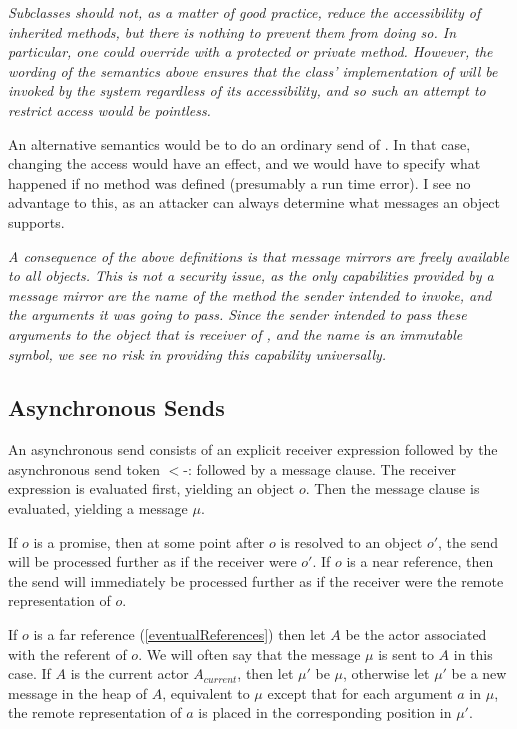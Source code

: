 \documentclass{article}
\begin{document}
{\it
Subclasses should not, as a matter of good practice, reduce the accessibility of inherited methods, but there is nothing to prevent them from doing so. In particular, one could override  with a protected or private method. However, the wording of the semantics above ensures that the class' implementation of    will be invoked by the system regardless of its accessibility, and so such an attempt to restrict access would be pointless.


An alternative semantics would be to do an ordinary send of  . In that case, changing the access would have an effect, and we would have to specify what happened if no
  method was defined (presumably a run time error). I see no advantage to
 this, as an attacker can always determine what messages an object supports.
}

{\it
A consequence of the above definitions is that message mirrors are freely available to all objects. This is not a security issue, as the only capabilities provided by a message mirror are the name of the method the sender intended to invoke, and the arguments it was going to pass. Since the sender intended to pass these arguments to the object that is receiver of , and the name is an immutable symbol, we see no risk in providing this capability universally.
}


\subsection{Asynchronous Sends}
\label{asynchronousSends}

An asynchronous send consists of an explicit receiver expression followed by the asynchronous send token $<$-: followed by a message clause. 
The receiver expression is evaluated first, yielding an object $o$. Then the message clause is evaluated, yielding a message $\mu$.

If $o$ is a promise, then at some point after $o$ is resolved to an object $o'$, the send will be processed further as if the receiver were $o'$. If $o$ is a near reference, then the send will immediately be processed further as if the receiver were the remote representation of $o$. 

If $o$ is a far reference (\ref{eventualReferences}) then let $A$ be the actor associated with the referent of $o$. We will often say that the message $\mu$ is sent to $A$ in this case. 
 If $A$ is the current actor $A_{current}$, then let $\mu'$ be $\mu$, otherwise let $\mu'$ be a new message in the heap of $A$, equivalent to $\mu$ except that for each argument $a$ in $\mu$, the remote representation of $a$ is placed in the corresponding position in $\mu'$. 
\end{document}

